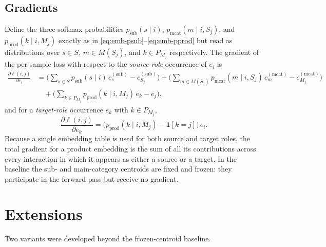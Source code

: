 \subsection{Gradients}
Define the three softmax probabilities $p_{\text{sub}}(s\mid i)$,
$p_{\text{mcat}}(m\mid i,S_j)$, and $p_{\text{prod}}(k\mid i,M_j)$ exactly as in
\eqref{eq:emb-psub}--\eqref{eq:emb-pprod} but read as distributions over $s\in
S$, $m\in M(S_j)$, and $k\in P_{M_j}$ respectively. The gradient of the
per-sample loss with respect to the \emph{source-role} occurrence of $e_i$ is
\begin{equation}
  \label{eq:emb-grad-ei}
  \begin{aligned}
  \frac{\partial\ell(i,j)}{\partial e_i}
    &= \Big(\sum_{s\in S} p_{\text{sub}}(s\mid i)\,c^{(\text{sub})}_{s}
           - c^{(\text{sub})}_{S_j}\Big)
     + \Big(\sum_{m\in M(S_j)} p_{\text{mcat}}(m\mid i,S_j)\,c^{(\text{mcat})}_{m}
           - c^{(\text{mcat})}_{M_j}\Big) \\
    &\quad + \Big(\sum_{k\in P_{M_j}} p_{\text{prod}}(k\mid i,M_j)\,e_k - e_j\Big),
  \end{aligned}
\end{equation}
and for a \emph{target-role} occurrence $e_k$ with $k\in P_{M_j}$,
\begin{equation}
  \label{eq:emb-grad-ek}
  \frac{\partial\ell(i,j)}{\partial e_k}
    = \big(p_{\text{prod}}(k\mid i,M_j) - \mathbf{1}[k=j]\big)\,e_i.
\end{equation}
Because a single embedding table is used for both source and target roles, the
total gradient for a product embedding is the sum of all its contributions
across every interaction in which it appears as either a source or a target. In
the baseline the sub- and main-category centroids are fixed and frozen: they
participate in the forward pass but receive no gradient.

\section{Extensions}
\label{sec:emb-extensions}

Two variants were developed beyond the frozen-centroid baseline.

